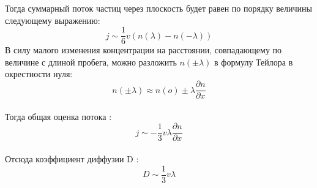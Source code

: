 \documentclass[a4paper, fontsize = 14pt]{article}
\begin{document}
Тогда суммарный поток частиц через плоскость будет равен по порядку величины следующему выражению:
$$j \sim \frac{1}{6}v(n(\lambda) - n(-\lambda))$$
В силу малого изменения концентрации на расстоянии, совпадающему по величине с длиной пробега, можно разложить $n(\pm \lambda)$ в формулу Тейлора в окрестности нуля: 
$$n(\pm \lambda) \approx n(o) \pm\lambda\frac{\partial n}{\partial x}$$ \\
Тогда общая оценка потока :
$$j \sim - \frac{1}{3}v\lambda \frac{\partial n}{\partial x}$$ \\
Отсюда коэффициент диффузии D :
\begin{equation}
D \sim \frac{1}{3}v \lambda  
\end{equation} \\
\\
\end{document}
